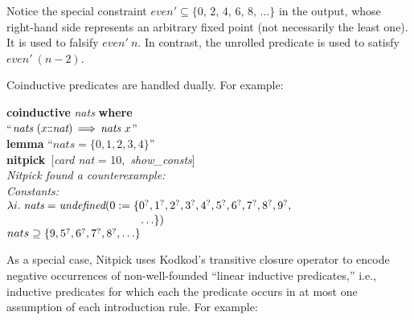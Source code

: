 \documentclass[a4paper,12pt]{article}
\def\Colon{\mathord{:\mkern-1.5mu:}}
\def\undef{\textit{undefined}}
\def\unr{\ldots}
\def\Q{{\smash{\lower.2ex\hbox{$\scriptstyle?$}}}}
\begin{document}
Notice the special constraint $\textit{even}' \subseteq \{0,\, 2,\, 4,\, 6,\,
8,\, \unr\}$ in the output, whose right-hand side represents an arbitrary
fixed point (not necessarily the least one). It is used to falsify
$\textit{even}'~n$. In contrast, the unrolled predicate is used to satisfy
$\textit{even}'~(n - 2)$.

Coinductive predicates are handled dually. For example:

\prew
\textbf{coinductive} \textit{nats} \textbf{where} \\
``$\textit{nats}~(x\Colon\textit{nat}) \,\Longrightarrow\, \textit{nats}~x$'' \\[2\smallskipamount]
\textbf{lemma} ``$\textit{nats} = \{0, 1, 2, 3, 4\}$'' \\
\textbf{nitpick}~[\textit{card nat} = 10,\, \textit{show\_consts}] \\[2\smallskipamount]
\slshape Nitpick found a counterexample:
\\[2\smallskipamount]
\hbox{}\qquad Constants: \nopagebreak \\
\hbox{}\qquad\qquad $\lambda i.\; \textit{nats} = \undef(0 := \{\!\begin{aligned}[t]
& 0^\Q, 1^\Q, 2^\Q, 3^\Q, 4^\Q, 5^\Q, 6^\Q, 7^\Q, 8^\Q, 9^\Q, \\[-2pt]
& \unr\})\end{aligned}$ \\
\hbox{}\qquad\qquad $nats \supseteq \{9, 5^\Q, 6^\Q, 7^\Q, 8^\Q, \unr\}$
\postw

As a special case, Nitpick uses Kodkod's transitive closure operator to encode
negative occurrences of non-well-founded ``linear inductive predicates,'' i.e.,
inductive predicates for which each the predicate occurs in at most one
assumption of each introduction rule. For example:
\end{document}
